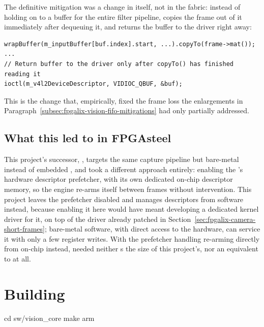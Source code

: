 The definitive mitigation was a change in  itself, not in the  fabric: instead of holding on to a  buffer for the entire filter pipeline,  copies the frame out of it immediately after dequeuing it, and returns the buffer to the driver right away:

\begin{lstlisting}
wrapBuffer(m_inputBuffer[buf.index].start, ...).copyTo(frame->mat());
...
// Return buffer to the driver only after copyTo() has finished reading it
ioctl(m_v4l2DeviceDescriptor, VIDIOC_QBUF, &buf);
\end{lstlisting}

This is the change that, empirically, fixed the frame loss the  enlargements in Paragraph~\ref{subsec:fpgalix-vision-fifo-mitigations} had only partially addressed.

\subsection{What this led to in FPGAsteel}
\label{subsec:fpgalix-vision-fpgasteel}

This project's successor, , targets the same  capture pipeline but bare-metal instead of embedded , and took a different approach entirely: enabling the 's hardware descriptor prefetcher, with its own dedicated on-chip descriptor memory, so the  engine re-arms itself between frames without  intervention. This project leaves the prefetcher disabled and manages descriptors from software instead, because enabling it here would have meant developing a dedicated kernel driver for it, on top of the  driver already patched in Section~\ref{sec:fpgalix-camera-short-frames}; bare-metal software, with direct access to the hardware, can service it with only a few register writes. With the prefetcher handling re-arming directly from on-chip  instead,  needed neither s the size of this project's, nor an equivalent to  at all.

\section{Building}
\label{sec:fpgalix-vision-building}

\begin{shellcodehost}
cd sw/vision_core
make arm
\end{shellcodehost}

